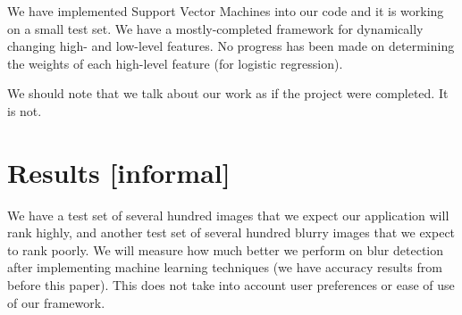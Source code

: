\documentclass[11pt,letter]{article}
\begin{document}
We have implemented Support Vector Machines into our code and it is working on a small test set. We have a mostly-completed framework for dynamically changing high- and low-level features. No progress has been made on determining the weights of each high-level feature (for logistic regression).

We should note that we talk about our work as if the project were completed. It is not.


\section{Results [informal]}
We have a test set of several hundred images that we expect our application will rank highly, and another test set of several hundred blurry images that we expect to rank poorly. We will measure how much better we perform on blur detection after implementing machine learning techniques (we have accuracy results from before this paper). This does not take into account user preferences or ease of use of our framework.




\end{document}

